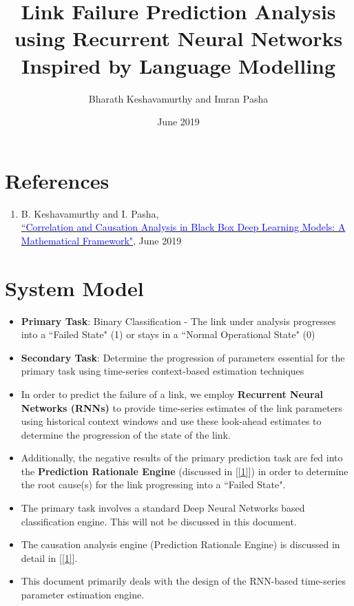 \documentclass{article}
\title{%
      Link Failure Prediction Analysis using Recurrent Neural Networks\\
      \large Inspired by Language Modelling}
\author{Bharath Keshavamurthy and Imran Pasha}
\affil{CISCO Systems, Inc.}
\date{June 2019}
\begin{document}
\maketitle
\section{References}
\begin{enumerate}
    \item B. Keshavamurthy and I. Pasha,\\ \href{https://1drv.ms/b/s!AuBe4WWXT0UOarnWAt3jLcnOvPs}{``\textcolor{blue}{Correlation and Causation Analysis in Black Box Deep Learning Models: A Mathematical Framework"}}, June 2019\label{1}
\end{enumerate}
\section{System Model}
\begin{itemize}
    \item \textbf{Primary Task}: Binary Classification - The link under analysis progresses into a ``Failed State" (1) or stays in a ``Normal Operational State" (0)
    \item \textbf{Secondary Task}: Determine the progression of parameters essential for the primary task using time-series context-based estimation techniques
    \item In order to predict the failure of a link, we employ \textbf{Recurrent Neural Networks (RNNs)} to provide time-series estimates of the link parameters using historical context windows and use these look-ahead estimates to determine the progression of the state of the link.
    \item Additionally, the negative results of the primary prediction task are fed into the \textbf{Prediction Rationale Engine} (discussed in [\ref{1}]) in order to determine the root cause(s) for the link progressing into a ``Failed State".
    \item The primary task involves a standard Deep Neural Networks based classification engine. This will not be discussed in this document.
    \item The causation analysis engine (Prediction Rationale Engine) is discussed in detail in [\ref{1}].
    \item This document primarily deals with the design of the RNN-based time-series parameter estimation engine.
\end{itemize}
\end{document}

